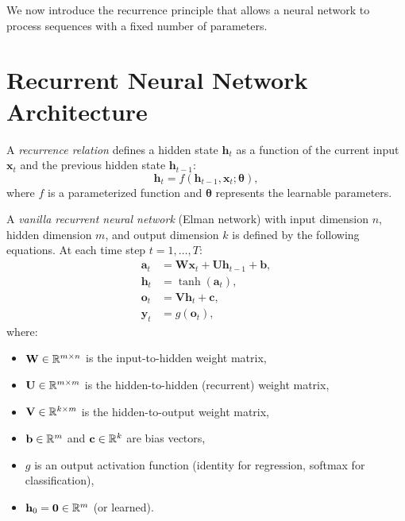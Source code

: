 \documentclass[11pt,a4paper]{article}
\begin{document}
We now introduce the recurrence principle that allows a neural
network to process sequences with a fixed number of parameters.

\section{Recurrent Neural Network Architecture}
\label{sec:rnn-architecture}

\begin{definition}
\label{def:recurrence}
A \emph{recurrence relation} defines a hidden state $\mathbf{h}_t$
as a function of the current input $\mathbf{x}_t$ and the previous
hidden state $\mathbf{h}_{t-1}$:
\[
  \mathbf{h}_t = f(\mathbf{h}_{t-1}, \mathbf{x}_t; \boldsymbol{\theta}),
\]
where $f$ is a parameterized function and $\boldsymbol{\theta}$
represents the learnable parameters.
\end{definition}

\begin{definition}
\label{def:vanilla-rnn}
A \emph{vanilla recurrent neural network} (Elman network) with input
dimension $n$, hidden dimension $m$, and output dimension $k$ is
defined by the following equations.  At each time step $t = 1, \ldots, T$:
\begin{align}
  \mathbf{a}_t &= \mathbf{W}\mathbf{x}_t + \mathbf{U}\mathbf{h}_{t-1}
    + \mathbf{b}, \label{eq:pre-activation} \\
  \mathbf{h}_t &= \tanh(\mathbf{a}_t), \label{eq:hidden-state} \\
  \mathbf{o}_t &= \mathbf{V}\mathbf{h}_t + \mathbf{c},
    \label{eq:output-pre} \\
  \mathbf{y}_t &= g(\mathbf{o}_t), \label{eq:output}
\end{align}
where:
\begin{itemize}[nosep]
  \item $\mathbf{W} \in \mathbb{R}^{m \times n}$ is the input-to-hidden
    weight matrix,
  \item $\mathbf{U} \in \mathbb{R}^{m \times m}$ is the hidden-to-hidden
    (recurrent) weight matrix,
  \item $\mathbf{V} \in \mathbb{R}^{k \times m}$ is the hidden-to-output
    weight matrix,
  \item $\mathbf{b} \in \mathbb{R}^m$ and $\mathbf{c} \in \mathbb{R}^k$ are bias
    vectors,
  \item $g$ is an output activation function (identity for regression,
    softmax for classification),
  \item $\mathbf{h}_0 = \mathbf{0} \in \mathbb{R}^m$ (or learned).
\end{itemize}
\end{definition}
\end{document}
